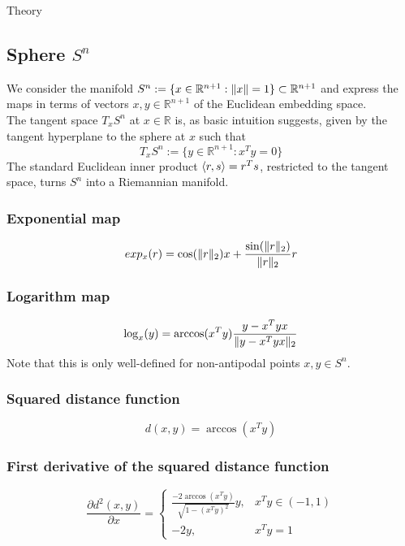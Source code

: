 \begin{chapter}{Theory}

\subsection{Sphere $S^n$} %
\label{sub:Sphere}
We consider the manifold $S^n:=\lbrace x\in\mathbb{R}^{n+1}: \| x \|=1\rbrace\subset\mathbb{R}^{n+1}$ and express the maps in terms of vectors $x,y\in\mathbb{R}^{n+1}$ of the Euclidean 
embedding space.\\
The tangent space $T_xS^n$ at $x\in\mathbb{R}$ is, as basic intuition suggests, given by the tangent hyperplane to the sphere at $x$ such that
\begin{equation}
    \label{eq:sntangentspace}
    T_xS^n:=\lbrace y\in\mathbb{R}^{n+1}: x^Ty=0 \rbrace
\end{equation}
The standard Euclidean inner product $\left\langle r,s \right\rangle=r^Ts$, restricted to the tangent space, turns $S^n$ into a Riemannian manifold.

\subsubsection{Exponential map} %
\label{ssub:ExponentialS2}
\begin{equation}
    exp_x(r)= \cos(\| r \|_2)x + \frac{\sin(\| r \|_{2})}{\| r \|_{2}}r 
\end{equation}

\subsubsection{Logarithm map} %
\label{ssub:LogarithmS2}
\begin{equation}
    \log_x(y)= \arccos(x^Ty)\frac{y-x^Tyx}{\| y-x^Tyx \|_2}
\end{equation}
Note that this is only well-defined for non-antipodal points $x,y\in S^n$.

\subsubsection{Squared distance function} %
\label{ssub:SquareddistanceS2}
\begin{equation}
    d(x,y)=\arccos(x^Ty)
\end{equation}

\subsubsection{First derivative of the squared distance function} %
\label{ssub:FirstDerS2}
\begin{equation}
    \frac{\partial d^2(x,y)}{\partial x}=\begin{cases}
	\frac{-2\arccos(x^Ty)}{\sqrt{1-(x^Ty)^{2}}}y, & x^Ty\in (-1,1)\\
	-2y, & x^Ty=1
    \end{cases}
\end{equation}


\end{chapter}
